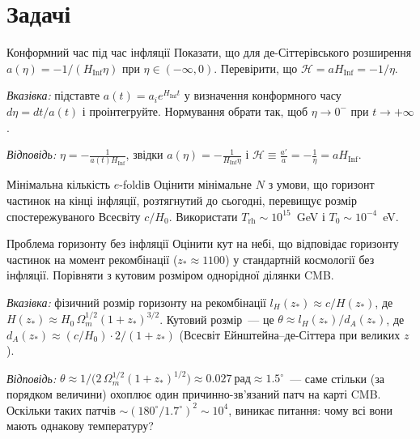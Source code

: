 \section*{Задачі}

\begin{problem}{Конформний час під час інфляції}
	Показати, що для де-Сіттерівського розширення
	$a(\eta) = -1/(H_{\text{Inf}}\eta)$ при $\eta \in (-\infty, 0)$.
	Перевірити, що $\mathcal{H} = a H_{\text{Inf}} = -1/\eta$.

	\textit{Вказівка:} підставте $a(t) = a_i e^{H_{\text{Inf}}t}$
	у визначення конформного часу $d\eta = dt/a(t)$ і проінтегруйте.
	Нормування обрати так, щоб $\eta \to 0^-$ при $t \to +\infty$.

	\textit{Відповідь:} $\eta = -\frac{1}{a(t)H_{\text{Inf}}}$,
	звідки $a(\eta) = -\frac{1}{H_{\text{Inf}}\eta}$
	і $\mathcal{H} \equiv \frac{a'}{a} = -\frac{1}{\eta} = aH_{\text{Inf}}$.
\end{problem}


\begin{problem}{Мінімальна кількість $e$-foldів}
	Оцінити мінімальне $N$ з умови, що горизонт частинок на кінці
	інфляції, розтягнутий до сьогодні, перевищує розмір
	спостережуваного Всесвіту $c/H_0$.
	Використати $T_{\text{rh}} \sim 10^{15}$~GeV і $T_0 \sim 10^{-4}$~eV.
\end{problem}


\begin{problem}{Проблема горизонту без інфляції}
	Оцінити кут на небі, що відповідає горизонту частинок на момент
	рекомбінації ($z_* \approx 1100$) у стандартній космології без інфляції.
	Порівняти з кутовим розміром однорідної ділянки CMB.

	\textit{Вказівка:} фізичний розмір горизонту на рекомбінації
	$l_H(z_*) \approx c/H(z_*)$, де $H(z_*) \approx H_0\,\Omega_m^{1/2}(1+z_*)^{3/2}$.
	Кутовий розмір~--- це $\theta \approx l_H(z_*)/d_A(z_*)$,
	де $d_A(z_*) \approx (c/H_0)\cdot 2/(1+z_*)$ (Всесвіт Ейнштейна--де-Сіттера при великих $z$).

	\textit{Відповідь:} $\theta \approx 1/\bigl(2\,\Omega_m^{1/2}(1+z_*)^{1/2}\bigr) \approx 0.027\ \text{рад} \approx 1.5^\circ$~---
	саме стільки (за порядком величини) охоплює один причинно-зв'язаний патч на карті CMB.
	Оскільки таких патчів $\sim (180^\circ/1.7^\circ)^2 \sim 10^4$,
	виникає питання: чому всі вони мають однакову температуру?
\end{problem}

